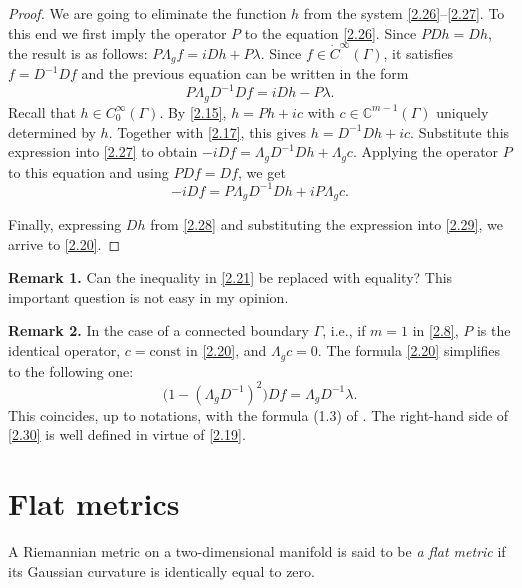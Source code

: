 \documentclass[12pt,reqno]{amsart}
\begin{document}
\begin{proof}
We are going to eliminate the function $h$ from the system \eqref{2.26}--\eqref{2.27}. To this end we first imply the operator $P$ to the equation \eqref{2.26}. Since $PDh=Dh$, the result is as follows:
$
P\Lambda_gf=iDh+P\lambda.
$
Since $f\in\dot C^\infty(\Gamma)$, it satisfies $f=D^{-1}Df$ and the previous equation can be written in the form
\begin{equation}
P\Lambda_gD^{-1}Df=iDh-P\lambda.
                                \label{2.28}
\end{equation}
Recall that $h\in C^\infty_0(\Gamma)$. By \eqref{2.15},
$
h=Ph+ic
$
with $c\in{\mathbb C}^{m-1}(\Gamma)$ uniquely determined by $h$. Together with \eqref{2.17}, this gives
$
h=D^{-1}Dh+ic.
$
Substitute this expression into \eqref{2.27} to obtain
$
-iDf=\Lambda_gD^{-1}Dh+\Lambda_gc.
$
Applying the operator $P$ to this equation and using $PDf=Df$, we get
\begin{equation}
-iDf=P\Lambda_gD^{-1}Dh+iP\Lambda_gc.
                                \label{2.29}
\end{equation}

Finally, expressing $Dh$ from \eqref{2.28} and substituting the expression into \eqref{2.29}, we arrive to \eqref{2.20}.
\end{proof}

{\bf Remark 1.} Can the inequality in \eqref{2.21} be replaced with equality? This important question is not easy in my opinion.

{\bf Remark 2.} In the case of a connected boundary $\Gamma$, i.e., if $m=1$ in \eqref{2.8}, $P$ is the identical operator, $c=\mbox{const}$ in \eqref{2.20}, and $\Lambda_gc=0$. The formula \eqref{2.20} simplifies to the following one:
\begin{equation}
\Big(1-(\Lambda_gD^{-1})^2\Big)Df=\Lambda_gD^{-1}\lambda.
                                \label{2.30}
\end{equation}
This coincides, up to notations, with the formula (1.3) of \cite{Be}. The right-hand side of \eqref{2.30} is well defined in virtue of \eqref{2.19}.



\section{Flat metrics}

A Riemannian metric on a two-dimensional manifold is said to be {\it a flat metric} if its Gaussian curvature is identically equal to zero.
\end{document}
